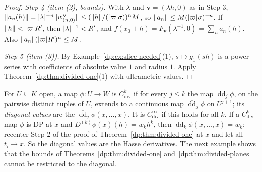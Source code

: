 \begin{proof}
\emph{Step 4 (item (2), bounds).} With $\lambda$ and $\mathbf v=(\lambda h,0)$ as in Step 3, $\lVert a_n(h)\rVert=\lvert \lambda\rvert^{-n}\lVert w^{\mathbf v}_{(n,0)}\rVert\le(\lVert h\rVert/(\lvert \varpi\rvert\sigma))^nM$, so $\lVert a_n\rVert\le M(\lvert \varpi\rvert\sigma)^{-n}$. If $\lVert h\rVert<\lvert \varpi\rvert R'$, then $\lvert \lambda\rvert^{-1}<R'$, and $f(x_0+h)=F_{\mathbf v}(\lambda^{-1},0)=\sum_na_n(h)$. Also $\lVert a_n\rVert(\lvert \varpi\rvert R')^n\le M$.

\emph{Step 5 (item (3)).} By Example~\ref{dp:ex:slice-needed}(1), $s\mapsto g_1(sh)$ is a power series with coefficients of absolute value $1$ and radius $1$. Apply Theorem~\ref{dp:thm:divided-one}(1) with ultrametric values.
\end{proof}

For $U\subseteq K$ open, a map $\phi\colon U\to W$ is \emph{$C^k_{\mathrm{div}}$} if for every $j\le k$ the map $\operatorname{dd}_j\phi$, on the pairwise distinct tuples of $U$, extends to a continuous map $\overline{\operatorname{dd}}_j\phi$ on $U^{j+1}$; its \emph{diagonal values} are the $\overline{\operatorname{dd}}_j\phi(x,\dots,x)$. It is \emph{$C^\infty_{\mathrm{div}}$} if this holds for all $k$. If a $C^k_{\mathrm{div}}$ map $\phi$ is DP at $x$ and $D^{(k)}\phi(x)(h)=w_kh^k$, then $\overline{\operatorname{dd}}_k\phi(x,\dots,x)=w_k$: recenter Step 2 of the proof of Theorem~\ref{dp:thm:divided-one} at $x$ and let all $t_i\to x$. So the diagonal values are the Hasse derivatives. The next example shows that the bounds of Theorems~\ref{dp:thm:divided-one} and~\ref{dp:thm:divided-planes} cannot be restricted to the diagonal.

